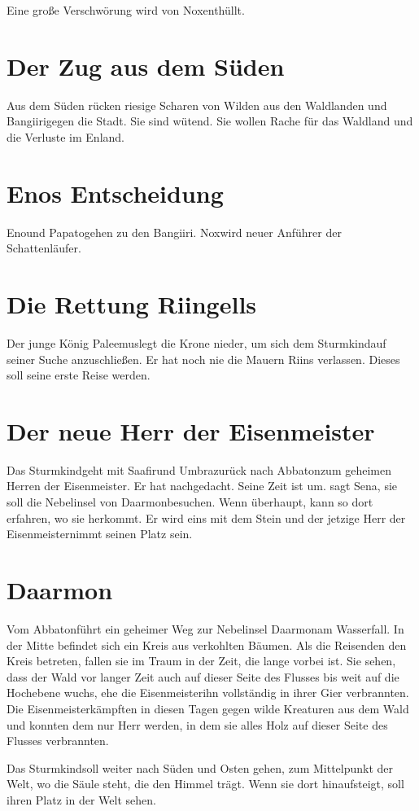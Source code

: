 \documentclass[12pt,a4paper,onecolumn,twoside,ngerman]{book}
\newcommand{\Sena}{Sena}
\newcommand{\Sturmkind}{Sturmkind}
\newcommand{\Bangiri}{Bangiiri}
\newcommand{\Papato}{Papato}
\newcommand{\Enland}{Enland}
\newcommand{\Schattenlaufer}{Schattenläufer}
\newcommand{\Eno}{Eno}
\newcommand{\Nox}{Nox}
\newcommand{\Umbra}{Umbra}
\newcommand{\Rhingell}{Riingell}
\newcommand{\Rhin}{Riin}
\newcommand{\Palemus}{Paleemus}
\newcommand{\Darmon}{Daarmon}
\newcommand{\Eisenmeister}{Eisenmeister}
\newcommand{\Abaton}{Abbaton}
\newcommand{\Safir}{Saafir}
\begin{document}
Eine große Verschwörung wird von \Nox enthüllt.

\section{Der Zug aus dem Süden}
Aus dem Süden rücken riesige Scharen von Wilden aus den Waldlanden und \Bangiri gegen die Stadt. Sie sind wütend. Sie wollen Rache für das Waldland und die Verluste im \Enland .

\section{{\Eno}s Entscheidung}
\Eno und \Papato gehen zu den \Bangiri . \Nox wird neuer Anführer der \Schattenlaufer .

\section{Die Rettung \Rhingell{s}}
Der junge König \Palemus legt die Krone nieder, um sich dem \Sturmkind auf seiner Suche anzuschließen. Er hat noch nie die Mauern \Rhin{s} verlassen. Dieses soll seine erste Reise werden.

\section{Der neue Herr der \Eisenmeister}
Das \Sturmkind geht mit \Safir und \Umbra zurück nach \Abaton zum geheimen Herren der \Eisenmeister . Er hat nachgedacht. Seine Zeit ist um.  sagt \Sena , sie soll die Nebelinsel von \Darmon besuchen. Wenn überhaupt, kann so dort erfahren, wo sie herkommt. Er wird eins mit dem Stein und der jetzige Herr der \Eisenmeister nimmt seinen Platz sein.

\section{\Darmon}
Vom \Abaton führt ein geheimer Weg zur Nebelinsel \Darmon am Wasserfall. In der Mitte befindet sich ein Kreis aus verkohlten Bäumen. Als die Reisenden den Kreis betreten, fallen sie im Traum in der Zeit, die lange vorbei ist. Sie sehen, dass der Wald vor langer Zeit auch auf dieser Seite des Flusses bis weit auf die Hochebene wuchs, ehe die \Eisenmeister ihn vollständig in ihrer Gier verbrannten. Die \Eisenmeister kämpften in diesen Tagen gegen wilde Kreaturen aus dem Wald und konnten dem nur Herr werden, in dem sie alles Holz auf dieser Seite des Flusses verbrannten. 

Das \Sturmkind soll weiter nach Süden und Osten gehen, zum Mittelpunkt der Welt, wo die Säule steht, die den Himmel trägt. Wenn sie dort hinaufsteigt, soll ihren Platz in der Welt sehen.

\end{document}
